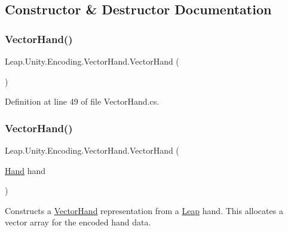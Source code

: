 \subsection{Constructor \& Destructor Documentation}
\mbox{\label{class_leap_1_1_unity_1_1_encoding_1_1_vector_hand_aca6ce4326fca4d753305b08cdf7f4e68}} 
\subsubsection{\texorpdfstring{VectorHand()}{VectorHand()}\hspace{0.1cm}{\footnotesize\ttfamily [1/2]}}
{\footnotesize\ttfamily Leap.\+Unity.\+Encoding.\+Vector\+Hand.\+Vector\+Hand (\begin{DoxyParamCaption}{ }\end{DoxyParamCaption})}



Definition at line 49 of file Vector\+Hand.\+cs.

\mbox{\label{class_leap_1_1_unity_1_1_encoding_1_1_vector_hand_ad68f6c62830b01f9dc778b2bfb6e778a}} 
\subsubsection{\texorpdfstring{VectorHand()}{VectorHand()}\hspace{0.1cm}{\footnotesize\ttfamily [2/2]}}
{\footnotesize\ttfamily Leap.\+Unity.\+Encoding.\+Vector\+Hand.\+Vector\+Hand (\begin{DoxyParamCaption}\item[{\mbox{\hyperlink{class_leap_1_1_hand}{Hand}}}]{hand }\end{DoxyParamCaption})}



Constructs a \mbox{\hyperlink{class_leap_1_1_unity_1_1_encoding_1_1_vector_hand}{Vector\+Hand}} representation from a \mbox{\hyperlink{namespace_leap_1_1_unity_1_1_leap}{Leap}} hand. This allocates a vector array for the encoded hand data. 

